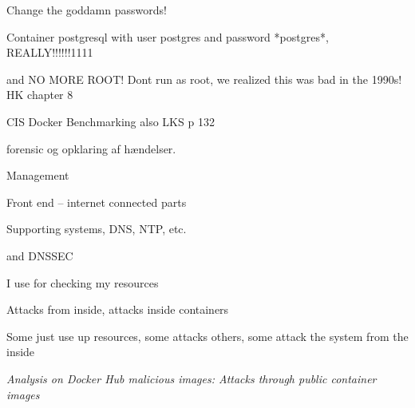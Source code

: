 \documentclass[Screen16to9,17pt]{foils}
\begin{document}

\begin{list2}
\item
\end{list2}
Change the goddamn passwords!

Container postgresql with user postgres and password *postgres*, REALLY!!!!!!1111

and NO MORE ROOT! Dont run as root, we realized this was bad in the 1990s!
HK chapter 8

CIS Docker Benchmarking also LKS p 132





\begin{list2}
\item
\end{list2}
forensic og opklaring af hændelser.




\begin{list2}
\item
\end{list2}
Management

Front end -- internet connected parts

Supporting systems, DNS, NTP, etc.


and DNSSEC

I use  for checking my resources



\begin{list2}
\item
\end{list2}

Attacks from inside, attacks inside containers

Some just use up resources, some attacks others, some attack the system from the inside


\begin{list2}
\item
\end{list2}

\emph{Analysis on Docker Hub malicious images: Attacks through public container images}


\end{document}
